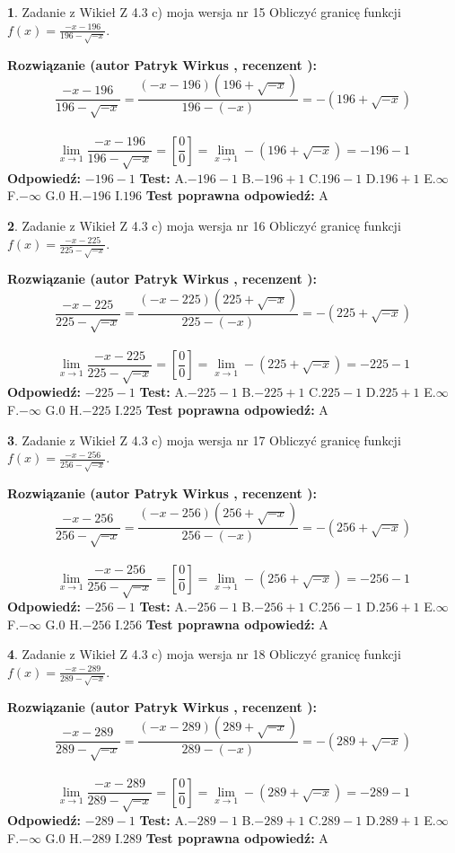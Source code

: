 \documentclass[12pt, a4paper]{article}
\theoremstyle{definition} %
\newtheorem{zad}{}
\newcommand{\zadStart}[1]{\begin{zad}#1\newline}
\newcommand{\zadStop}{\end{zad}}
\newcommand{\rozwStart}[2]{\noindent \textbf{Rozwiązanie (autor #1 , recenzent #2): }\newline}
\newcommand{\rozwStop}{\newline}
\newcommand{\odpStart}{\noindent \textbf{Odpowiedź:}\newline}
\newcommand{\odpStop}{\newline}
\newcommand{\testStart}{\noindent \textbf{Test:}\newline}
\newcommand{\testStop}{\newline}
\newcommand{\kluczStart}{\noindent \textbf{Test poprawna odpowiedź:}\newline}
\newcommand{\kluczStop}{\newline}
\begin{document}
\zadStart{Zadanie z Wikieł Z 4.3 c) moja wersja nr 15}
Obliczyć granicę funkcji $f(x)=\frac{-x-196}{196-\sqrt{-x}}$.
\zadStop
\rozwStart{Patryk Wirkus}{}
$$\frac{-x-196}{196-\sqrt{-x}}=\frac{(-x-196)(196+\sqrt{-x})}{196-(-x)}=-(196+\sqrt{-x})$$
\\
$$\lim\limits_{x\to1}\frac{-x-196}{196-\sqrt{-x}}=[\frac{0}{0}]=\lim\limits_{x\to1}-(196+\sqrt{-x}) =-196-1$$
\rozwStop
\odpStart
$-196-1$
\odpStop
\testStart
A.$-196-1$
B.$-196+1$
C.$196-1$
D.$196+1$
E.$\infty$
F.$-\infty$
G.$0$
H.$-196$
I.$196$
\testStop
\kluczStart
A
\kluczStop



\zadStart{Zadanie z Wikieł Z 4.3 c) moja wersja nr 16}
Obliczyć granicę funkcji $f(x)=\frac{-x-225}{225-\sqrt{-x}}$.
\zadStop
\rozwStart{Patryk Wirkus}{}
$$\frac{-x-225}{225-\sqrt{-x}}=\frac{(-x-225)(225+\sqrt{-x})}{225-(-x)}=-(225+\sqrt{-x})$$
\\
$$\lim\limits_{x\to1}\frac{-x-225}{225-\sqrt{-x}}=[\frac{0}{0}]=\lim\limits_{x\to1}-(225+\sqrt{-x}) =-225-1$$
\rozwStop
\odpStart
$-225-1$
\odpStop
\testStart
A.$-225-1$
B.$-225+1$
C.$225-1$
D.$225+1$
E.$\infty$
F.$-\infty$
G.$0$
H.$-225$
I.$225$
\testStop
\kluczStart
A
\kluczStop



\zadStart{Zadanie z Wikieł Z 4.3 c) moja wersja nr 17}
Obliczyć granicę funkcji $f(x)=\frac{-x-256}{256-\sqrt{-x}}$.
\zadStop
\rozwStart{Patryk Wirkus}{}
$$\frac{-x-256}{256-\sqrt{-x}}=\frac{(-x-256)(256+\sqrt{-x})}{256-(-x)}=-(256+\sqrt{-x})$$
\\
$$\lim\limits_{x\to1}\frac{-x-256}{256-\sqrt{-x}}=[\frac{0}{0}]=\lim\limits_{x\to1}-(256+\sqrt{-x}) =-256-1$$
\rozwStop
\odpStart
$-256-1$
\odpStop
\testStart
A.$-256-1$
B.$-256+1$
C.$256-1$
D.$256+1$
E.$\infty$
F.$-\infty$
G.$0$
H.$-256$
I.$256$
\testStop
\kluczStart
A
\kluczStop



\zadStart{Zadanie z Wikieł Z 4.3 c) moja wersja nr 18}
Obliczyć granicę funkcji $f(x)=\frac{-x-289}{289-\sqrt{-x}}$.
\zadStop
\rozwStart{Patryk Wirkus}{}
$$\frac{-x-289}{289-\sqrt{-x}}=\frac{(-x-289)(289+\sqrt{-x})}{289-(-x)}=-(289+\sqrt{-x})$$
\\
$$\lim\limits_{x\to1}\frac{-x-289}{289-\sqrt{-x}}=[\frac{0}{0}]=\lim\limits_{x\to1}-(289+\sqrt{-x}) =-289-1$$
\rozwStop
\odpStart
$-289-1$
\odpStop
\testStart
A.$-289-1$
B.$-289+1$
C.$289-1$
D.$289+1$
E.$\infty$
F.$-\infty$
G.$0$
H.$-289$
I.$289$
\testStop
\kluczStart
A
\kluczStop
\end{document}
